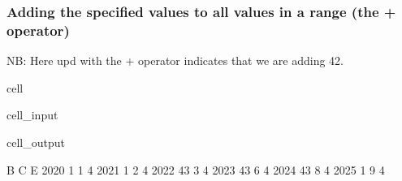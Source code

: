 \documentclass[letterpaper,10pt,english]{jupyterBook}
\begin{document}
\subsubsection{Adding  the specified  values to all values in a range (the + operator)}
\label{\detokenize{content/04_PythonEssentials/UpdateCommand:adding-the-specified-values-to-all-values-in-a-range-the-operator}}
\sphinxAtStartPar
NB: Here upd with the  + operator indicates that we are adding 42.

\begin{sphinxuseclass}{cell}\begin{sphinxVerbatimInput}

\begin{sphinxuseclass}{cell_input}
\begin{sphinxVerbatim}[commandchars=\\\{\}]
\end{sphinxVerbatim}

\end{sphinxuseclass}\end{sphinxVerbatimInput}
\begin{sphinxVerbatimOutput}

\begin{sphinxuseclass}{cell_output}
\begin{sphinxVerbatim}[commandchars=\\\{\}]
       B  C  E
2020   1  1  4
2021   1  2  4
2022  43  3  4
2023  43  6  4
2024  43  8  4
2025   1  9  4
\end{sphinxVerbatim}

\end{sphinxuseclass}\end{sphinxVerbatimOutput}

\end{sphinxuseclass}
\end{document}

